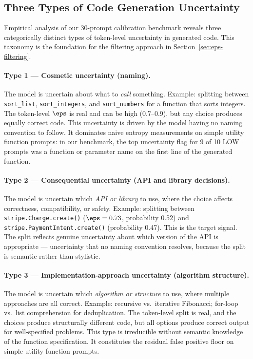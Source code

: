 \subsection{Three Types of Code Generation Uncertainty}
\label{sec:eps-taxonomy}

Empirical analysis of our 30-prompt calibration benchmark reveals three
categorically distinct types of token-level uncertainty in generated code.
This taxonomy is the foundation for the filtering approach in
Section~\ref{sec:eps-filtering}.

\paragraph{Type 1 --- Cosmetic uncertainty (naming).}
The model is uncertain about what to \emph{call} something. Example: splitting
between \texttt{sort\_list}, \texttt{sort\_integers}, and \texttt{sort\_numbers}
for a function that sorts integers. The token-level $\eps$ is real and can be
high (0.7--0.9), but any choice produces equally correct code. This uncertainty
is driven by the model having no naming convention to follow. It dominates
naive entropy measurements on simple utility function prompts: in our benchmark,
the top uncertainty flag for 9 of 10 LOW prompts was a function or parameter
name on the first line of the generated function.

\paragraph{Type 2 --- Consequential uncertainty (API and library decisions).}
The model is uncertain which \emph{API or library} to use, where the choice
affects correctness, compatibility, or safety. Example: splitting between
\texttt{stripe.Charge.create()} ($\eps = 0.73$, probability 0.52) and
\texttt{stripe.PaymentIntent.create()} (probability 0.47). This is the
target signal. The split reflects genuine uncertainty about which version of
the API is appropriate --- uncertainty that no naming convention resolves,
because the split is semantic rather than stylistic.

\paragraph{Type 3 --- Implementation-approach uncertainty (algorithm structure).}
The model is uncertain which \emph{algorithm or structure} to use, where
multiple approaches are all correct. Example: recursive vs.\ iterative
Fibonacci; for-loop vs.\ list comprehension for deduplication. The token-level
split is real, and the choices produce structurally different code, but all
options produce correct output for well-specified problems. This type is
irreducible without semantic knowledge of the function specification. It
constitutes the residual false positive floor on simple utility function prompts.

